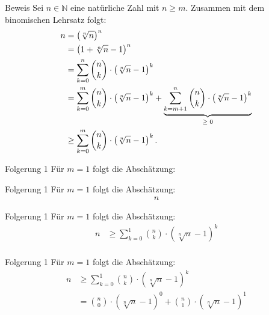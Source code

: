 \documentclass[10pt]{beamer}
\def\bN{\mathbb{N}}
\begin{document}
\begin{frame}{Beweis}
    Sei \( n \in \bN \) eine natürliche Zahl mit \( n \geq m \). Zusammen mit dem binomischen Lehrsatz folgt:
    \begin{align*}
        n
        & = \left( \sqrt[n]{n} \right)^{n} \\
        & = \left( 1 + \sqrt[n]{n} - 1 \right)^{n} \\
        & = \sum_{k = 0}^{n} \binom{n}{k} \cdot \left( \sqrt[n]{n} - 1 \right)^{k} \\
        & = \sum_{k = 0}^{m} \binom{n}{k} \cdot \left( \sqrt[n]{n} - 1 \right)^{k} + \underbrace{\sum_{k = m + 1}^{n} \binom{n}{k} \cdot \left( \sqrt[n]{n} - 1 \right)^{k}}_{\text{\( \geq 0 \)}} \\
        & \geq \sum_{k = 0}^{m} \binom{n}{k} \cdot \left( \sqrt[n]{n} - 1 \right)^{k}.
    \end{align*}
\end{frame}



\begin{frame}{Folgerung 1}
    Für \( m = 1 \) folgt die Abschätzung:
\end{frame}



\begin{frame}{Folgerung 1}
    Für \( m = 1 \) folgt die Abschätzung:
    \begin{align*}
        n 
    \end{align*}
\end{frame}



\begin{frame}{Folgerung 1}
    Für \( m = 1 \) folgt die Abschätzung:
    \begin{align*}
        n 
        & \geq \sum_{k = 0}^{1} \binom{n}{k} \cdot \left( \sqrt[n]{n} - 1 \right)^{k} \\
    \end{align*}
\end{frame}



\begin{frame}{Folgerung 1}
    Für \( m = 1 \) folgt die Abschätzung:
    \begin{align*}
        n 
        & \geq \sum_{k = 0}^{1} \binom{n}{k} \cdot \left( \sqrt[n]{n} - 1 \right)^{k} \\
        & = \binom{n}{0} \cdot \left( \sqrt[n]{n} - 1 \right)^{0} + \binom{n}{1} \cdot \left( \sqrt[n]{n} - 1 \right)^{1} \\
    \end{align*}
\end{frame}
\end{document}
